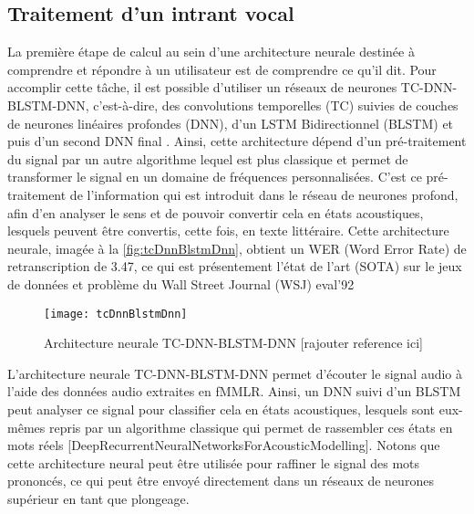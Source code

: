 \subsection{Traitement d'un intrant vocal}
La première étape de calcul au sein d’une architecture neurale destinée à comprendre et répondre à un utilisateur est de comprendre ce qu’il dit. Pour accomplir cette tâche, il est possible d’utiliser un réseaux de neurones TC-DNN-BLSTM-DNN, c’est-à-dire, des convolutions temporelles (TC) suivies de couches de neurones linéaires profondes (DNN), d’un LSTM Bidirectionnel (BLSTM) et puis d’un second DNN final \cite{acousticModeling}. Ainsi, cette architecture dépend d’un pré-traitement du signal par un autre algorithme lequel est plus classique et permet de transformer le signal en un domaine de fréquences personnalisées. C’est ce pré-traitement de l’information qui est introduit dans le réseau de neurones profond, afin d’en analyser le sens et de pouvoir convertir cela en états acoustiques, lesquels peuvent être convertis, cette fois, en texte littéraire. Cette architecture neurale, imagée à la \autoref{fig:tcDnnBlstmDnn}, obtient un WER (Word Error Rate) de retranscription de 3.47, ce qui est présentement l’état de l’art (SOTA) sur le jeux de données et problème du Wall Street Journal (WSJ) eval’92 \\%

\begin{figure*}
  \centering
  \texttt{[image: tcDnnBlstmDnn]}
  \caption{Architecture neurale TC-DNN-BLSTM-DNN [rajouter reference ici]}
  \label{fig:tcDnnBlstmDnn}
\end{figure*}

L’architecture neurale TC-DNN-BLSTM-DNN permet d’écouter le signal audio à l’aide des données audio extraites en fMMLR. Ainsi, un DNN suivi d’un BLSTM peut analyser ce signal pour classifier cela en états acoustiques, lesquels sont eux-mêmes repris par un algorithme classique qui permet de rassembler ces états en mots réels [DeepRecurrentNeuralNetworksForAcousticModelling]. Notons que cette architecture neural peut être utilisée pour raffiner le signal des mots prononcés, ce qui peut être envoyé directement dans un réseaux de neurones supérieur en tant que plongeage.

